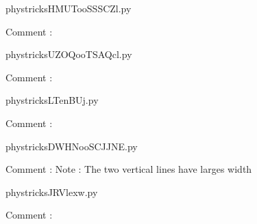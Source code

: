     \clearpage
    


    \newcommand{\CaptionFigHMUTooSSSCZl}{<+Type your caption here+>}
    \begin{center}
        
    \end{center}
    phystricksHMUTooSSSCZl.py

    Comment : 

    \clearpage
    


    \newcommand{\CaptionFigUZOQooTSAQcl}{<+Type your caption here+>}
    \begin{center}
        
    \end{center}
    phystricksUZOQooTSAQcl.py

    Comment : 

    \clearpage
    


    \newcommand{\CaptionFigLTenBUj}{<+Type your caption here+>}
    \begin{center}
        
    \end{center}
    phystricksLTenBUj.py

    Comment : 

    \clearpage
    


    \newcommand{\CaptionFigDWHNooSCJJNE}{<+Type your caption here+>}
    \begin{center}
        
    \end{center}
    phystricksDWHNooSCJJNE.py

    Comment : Note : The two vertical lines have larges width

    \clearpage
    


    \newcommand{\CaptionFigJRVlexw}{<+Type your caption here+>}
    \begin{center}
        
    \end{center}
    phystricksJRVlexw.py

    Comment : 

    \clearpage
    


